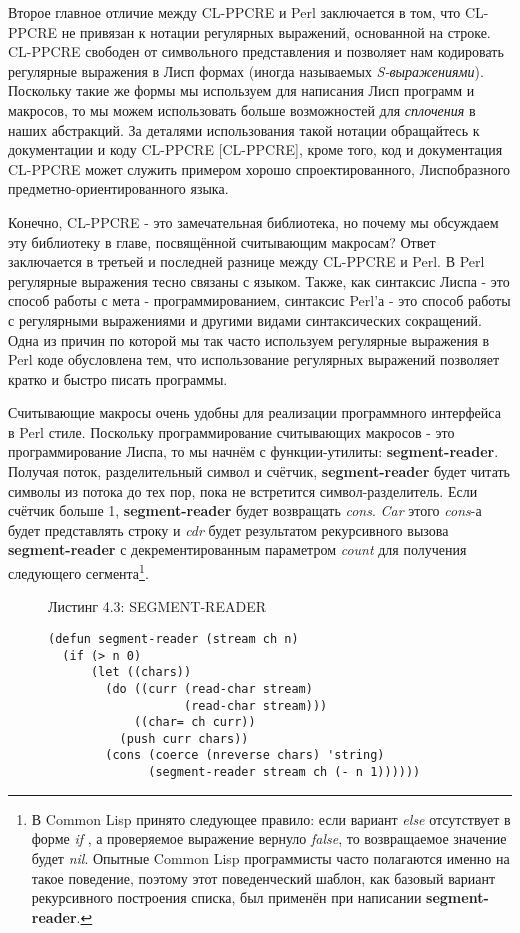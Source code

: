 Второе главное отличие между CL-PPCRE и Perl заключается в том, что CL-PPCRE не привязан к нотации регулярных выражений, основанной на строке. CL-PPCRE свободен от символьного представления и позволяет нам кодировать регулярные выражения в Лисп формах (иногда называемых \emph{S-выражениями}). Поскольку такие же формы мы используем для написания Лисп программ и макросов, то мы можем использовать больше возможностей для \emph{сплочения} в наших абстракций. За деталями использования такой нотации обращайтесь к документации и коду CL-PPCRE [CL-PPCRE], кроме того, код и документация CL-PPCRE может служить примером хорошо спроектированного, Лиспобразного предметно-ориентированного языка.

Конечно, CL-PPCRE - это замечательная библиотека, но почему мы обсуждаем эту библиотеку в главе, посвящённой считывающим макросам? Ответ заключается в третьей и последней разнице между CL-PPCRE и Perl. В Perl регулярные выражения тесно связаны с языком. Также, как синтаксис Лиспа - это способ работы с мета - программированием, синтаксис Perl'а - это способ работы с регулярными выражениями и другими видами синтаксических сокращений. Одна из причин по которой мы так часто используем регулярные выражения в Perl коде обусловлена тем, что использование регулярных выражений позволяет кратко и быстро писать программы.

Считывающие макросы очень удобны для реализации программного интерфейса в Perl стиле. Поскольку программирование считывающих макросов - это программирование Лиспа, то мы начнём с функции-утилиты: \textbf{segment-reader}. Получая поток, разделительный символ и счётчик, \textbf{segment-reader} будет читать символы из потока до тех пор, пока не встретится символ-разделитель. Если счётчик больше 1, \textbf{segment-reader} будет возвращать \emph{cons}. \emph{Car} этого \emph{cons}-а будет представлять строку и \emph{cdr} будет результатом рекурсивного вызова \textbf{segment-reader} с декрементированным параметром \emph{count} для получения следующего сегмента\footnote{В Common Lisp принято следующее правило: если вариант \emph{else} отсутствует в форме \emph{if} , а проверяемое выражение вернуло \emph{false}, то возвращаемое значение будет \emph{nil}. Опытные Common Lisp программисты часто полагаются именно на такое поведение, поэтому этот поведенческий шаблон, как базовый вариант рекурсивного построения списка, был применён при написании \textbf{segment-reader}.}.

\begin{figure}Листинг 4.3: SEGMENT-READER\label{listing_4.3}
\listbegin
\begin{verbatim}
(defun segment-reader (stream ch n)
  (if (> n 0)
      (let ((chars))
        (do ((curr (read-char stream)
                   (read-char stream)))
            ((char= ch curr))
          (push curr chars))
        (cons (coerce (nreverse chars) 'string)
              (segment-reader stream ch (- n 1))))))
\end{verbatim}
\listend
\end{figure}

